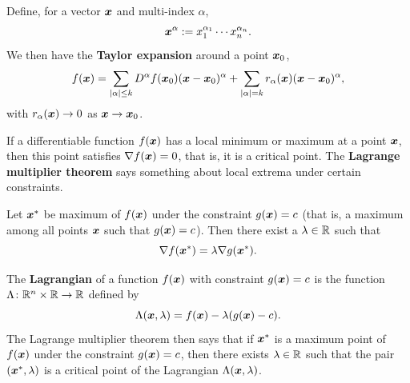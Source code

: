Define, for a vector $\bm{x}$ and multi-index $\alpha$,
\begin{equation*}
 \bm{x}^{\alpha} := x_1^{\alpha_1}\cdots x_n^{\alpha_n}.
\end{equation*}
We then have the \textbf{Taylor expansion} around a point $\bm{x}_0$,
\begin{equation*}
 f(\bm{x}) = \sum_{|\alpha|\leq k} D^{\alpha}f(\bm{x}_0)(\bm{x}-\bm{x}_0)^{\alpha} + \sum_{|\alpha|=k} r_\alpha(\bm{x})(\bm{x}-\bm{x}_0)^{\alpha},
\end{equation*}
with $r_\alpha(\bm{x})\to 0$ as $\bm{x}\to \bm{x}_0$.

If a differentiable function $f(\bm{x})$ has a local minimum or maximum at a point $\bm{x}$, then this point satisfies $\nabla f(\bm{x})=0$,
that is, it is a critical point. 
The \textbf{Lagrange multiplier theorem} says something about local extrema under certain constraints.

\begin{theorem*}
Let $\bm{x}^*$ be maximum of $f(\bm{x})$ under the constraint $g(\bm{x})=c$ (that is, a maximum among all points $\bm{x}$ such that $g(\bm{x})=c$). Then there exist a $\lambda\in \mathbb{R}$ 
such that
\begin{equation*}
  \nabla f(\bm{x}^*) = \lambda \nabla g(\bm{x}^*).
\end{equation*}
\end{theorem*}

The \textbf{Lagrangian} of a function $f(\bm{x})$ with constraint $g(\bm{x})=c$ is the function $\Lambda \colon \mathbb{R}^n\times \mathbb{R}\rightarrow \mathbb{R}$ defined by
\begin{equation*}
  \Lambda(\bm{x},\lambda) = f(\bm{x})-\lambda (g(\bm{x})-c).
\end{equation*}
The Lagrange multiplier theorem then says that if $\bm{x}^*$ is a maximum point of $f(\bm{x})$ under the constraint $g(\bm{x})=c$, then there exists $\lambda\in \mathbb{R}$ such that the pair $(\bm{x}^*,\lambda)$ is
a critical point of the Lagrangian $\Lambda(\bm{x},\lambda)$. 

